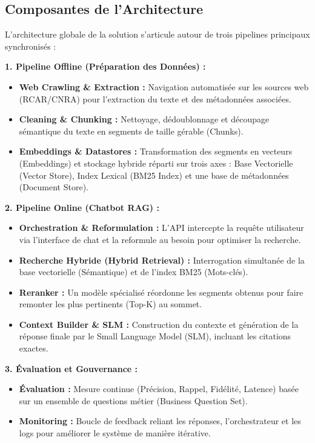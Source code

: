 \documentclass[12pt,a4paper]{article}
\begin{document}
\subsection{Composantes de l'Architecture}
L'architecture globale de la solution s'articule autour de trois pipelines principaux synchronisés :

\textbf{1. Pipeline Offline (Préparation des Données) :}
\begin{itemize}
    \item \textbf{Web Crawling \& Extraction :} Navigation automatisée sur les sources web (RCAR/CNRA) pour l'extraction du texte et des métadonnées associées.
    \item \textbf{Cleaning \& Chunking :} Nettoyage, dédoublonnage et découpage sémantique du texte en segments de taille gérable (Chunks).
    \item \textbf{Embeddings \& Datastores :} Transformation des segments en vecteurs (Embeddings) et stockage hybride réparti sur trois axes : Base Vectorielle (Vector Store), Index Lexical (BM25 Index) et une base de métadonnées (Document Store).
\end{itemize}

\textbf{2. Pipeline Online (Chatbot RAG) :}
\begin{itemize}
    \item \textbf{Orchestration \& Reformulation :} L'API intercepte la requête utilisateur via l'interface de chat et la reformule au besoin pour optimiser la recherche.
    \item \textbf{Recherche Hybride (Hybrid Retrieval) :} Interrogation simultanée de la base vectorielle (Sémantique) et de l'index BM25 (Mots-clés).
    \item \textbf{Reranker :} Un modèle spécialisé réordonne les segments obtenus pour faire remonter les plus pertinents (Top-K) au sommet.
    \item \textbf{Context Builder \& SLM :} Construction du contexte et génération de la réponse finale par le Small Language Model (SLM), incluant les citations exactes.
\end{itemize}

\textbf{3. Évaluation et Gouvernance :}
\begin{itemize}
    \item \textbf{Évaluation :} Mesure continue (Précision, Rappel, Fidélité, Latence) basée sur un ensemble de questions métier (Business Question Set).
    \item \textbf{Monitoring :} Boucle de feedback reliant les réponses, l'orchestrateur et les logs pour améliorer le système de manière itérative.
\end{itemize}
\end{document}
